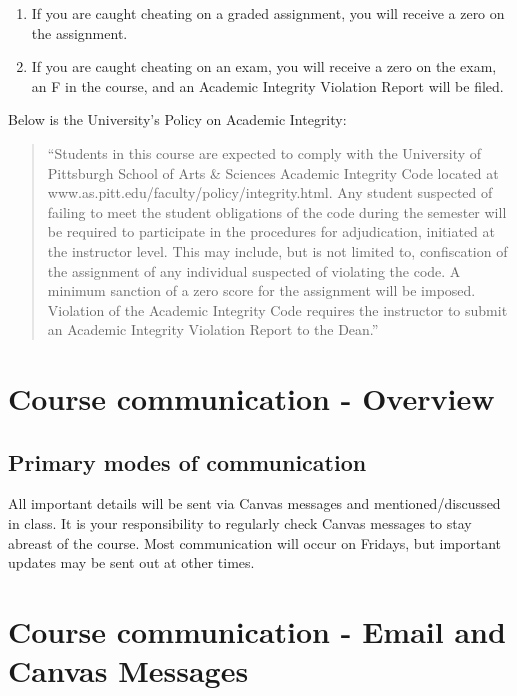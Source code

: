 \documentclass[
]{book}
\providecommand{\tightlist}{%
  \setlength{\itemsep}{0pt}\setlength{\parskip}{0pt}}
\begin{document}
\begin{enumerate}
\def\labelenumi{\arabic{enumi}.}
\tightlist
\item
  If you are caught cheating on a graded assignment, you will receive a zero on the assignment.
\item
  If you are caught cheating on an exam, you will receive a zero on the exam, an F in the course, and an Academic Integrity Violation Report will be filed.
\end{enumerate}

Below is the University's Policy on Academic Integrity:

\begin{quote}
``Students in this course are expected to comply with the University of Pittsburgh School of Arts \& Sciences Academic Integrity Code located at www.as.pitt.edu/faculty/policy/integrity.html. Any student suspected of failing to meet the student obligations of the code during the semester will be required to participate in the procedures for adjudication, initiated at the instructor level. This may include, but is not limited to, confiscation of the assignment of any individual suspected of violating the code. A minimum sanction of a zero score for the assignment will be imposed. Violation of the Academic Integrity Code requires the instructor to submit an Academic Integrity Violation Report to the Dean.''
\end{quote}

\hypertarget{course-communication---overview}{%
\chapter{Course communication - Overview}\label{course-communication---overview}}

\hypertarget{primary-modes-of-communication}{%
\section{Primary modes of communication}\label{primary-modes-of-communication}}

All important details will be sent via Canvas messages and mentioned/discussed in class. It is your responsibility to regularly check Canvas messages to stay abreast of the course. Most communication will occur on Fridays, but important updates may be sent out at other times.

\hypertarget{email_and_canvas_msg}{%
\chapter{Course communication - Email and Canvas Messages}\label{email_and_canvas_msg}}
\end{document}
